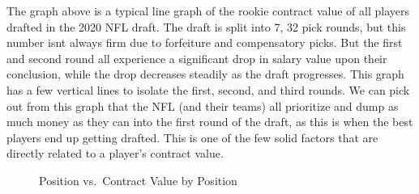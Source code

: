 \documentclass[
  letterpaper,
  DIV=11,
  numbers=noendperiod]{scrartcl}
\begin{document}
The graph above is a typical line graph of the rookie contract value of
all players drafted in the 2020 NFL draft. The draft is split into 7, 32
pick rounds, but this number isnt always firm due to forfeiture and
compensatory picks. But the first and second round all experience a
significant drop in salary value upon their conclusion, while the drop
decreases steadily as the draft progresses. This graph has a few
vertical lines to isolate the first, second, and third rounds. We can
pick out from this graph that the NFL (and their teams) all prioritize
and dump as much money as they can into the first round of the draft, as
this is when the best players end up getting drafted. This is one of the
few solid factors that are directly related to a player's contract
value.

\begin{figure}[H]


\caption{\label{fig-pos_vs_contract}Position vs.~Contract Value by
Position}

\end{figure}%
\end{document}
